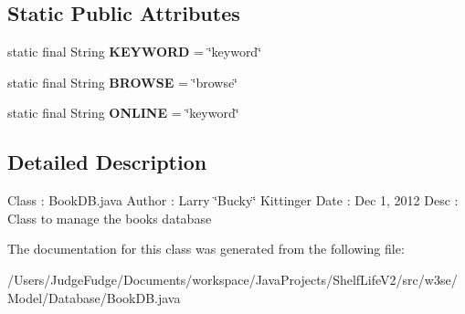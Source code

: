 \subsection*{Static Public Attributes}
\begin{DoxyCompactItemize}
\item 
\hypertarget{classw3se_1_1_model_1_1_database_1_1_book_d_b_a5e59150252579ea52302307acc500ad9}{static final String {\bfseries K\-E\-Y\-W\-O\-R\-D} = \char`\"{}keyword\char`\"{}}\label{classw3se_1_1_model_1_1_database_1_1_book_d_b_a5e59150252579ea52302307acc500ad9}

\item 
\hypertarget{classw3se_1_1_model_1_1_database_1_1_book_d_b_a40ca9306aae9fe749a5639748d179ea4}{static final String {\bfseries B\-R\-O\-W\-S\-E} = \char`\"{}browse\char`\"{}}\label{classw3se_1_1_model_1_1_database_1_1_book_d_b_a40ca9306aae9fe749a5639748d179ea4}

\item 
\hypertarget{classw3se_1_1_model_1_1_database_1_1_book_d_b_a6dea8c64423567d72a68bab9d75ab74b}{static final String {\bfseries O\-N\-L\-I\-N\-E} = \char`\"{}keyword\char`\"{}}\label{classw3se_1_1_model_1_1_database_1_1_book_d_b_a6dea8c64423567d72a68bab9d75ab74b}

\end{DoxyCompactItemize}


\subsection{Detailed Description}
Class \-: Book\-D\-B.\-java Author \-: Larry \char`\"{}\-Bucky\char`\"{} Kittinger Date \-: Dec 1, 2012 Desc \-: Class to manage the books database 

The documentation for this class was generated from the following file\-:\begin{DoxyCompactItemize}
\item 
/\-Users/\-Judge\-Fudge/\-Documents/workspace/\-Java\-Projects/\-Shelf\-Life\-V2/src/w3se/\-Model/\-Database/Book\-D\-B.\-java\end{DoxyCompactItemize}
